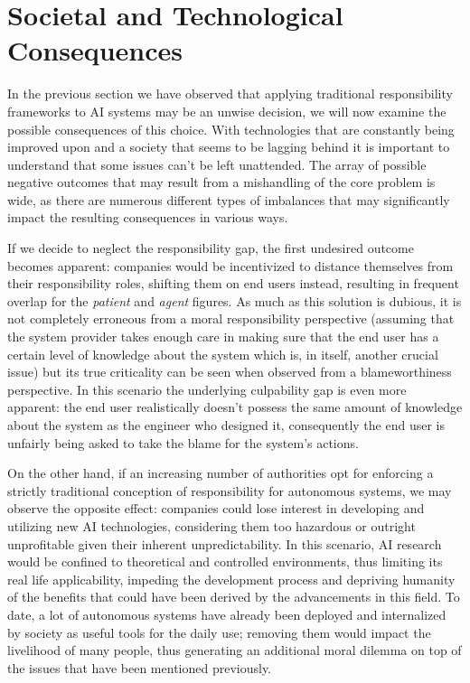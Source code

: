 \section{Societal and Technological Consequences}\label{sec:consequences}

In the previous section we have observed that applying traditional responsibility frameworks to AI systems may be an unwise decision, we will now examine the possible consequences of this choice.
With technologies that are constantly being improved upon and a society that seems to be lagging behind it is important to understand that some issues can't be left unattended.
The array of possible negative outcomes that may result from a mishandling of the core problem is wide, as there are numerous different types of imbalances that may significantly impact the resulting consequences in various ways.

If we decide to neglect the responsibility gap, the first undesired outcome becomes apparent: companies would be incentivized to distance themselves from their responsibility roles, shifting them on end users instead, resulting in frequent overlap for the \textit{patient} and \textit{agent} figures.
As much as this solution is dubious, it is not completely erroneous from a moral responsibility perspective (assuming that the system provider takes enough care in making sure that the end user has a certain level of knowledge about the system which is, in itself, another crucial issue) but its true criticality can be seen when observed from a blameworthiness perspective.
In this scenario the underlying culpability gap \parencite{SANFRG} is even more apparent: the end user realistically doesn't possess the same amount of knowledge about the system as the engineer who designed it, consequently the end user is unfairly being asked to take the blame for the system's actions.

On the other hand, if an increasing number of authorities opt for enforcing a strictly traditional conception of responsibility for autonomous systems, we may observe the opposite effect: companies could lose interest in developing and utilizing new AI technologies, considering them too hazardous or outright unprofitable given their inherent unpredictability.
In this scenario, AI research would be confined to theoretical and controlled environments, thus limiting its real life applicability, impeding the development process and depriving humanity of the benefits that could have been derived by the advancements in this field.
To date, a lot of autonomous systems have already been deployed and internalized by society as useful tools for the daily use; removing them would impact the livelihood of many people, thus generating an additional moral dilemma on top of the issues that have been mentioned previously.